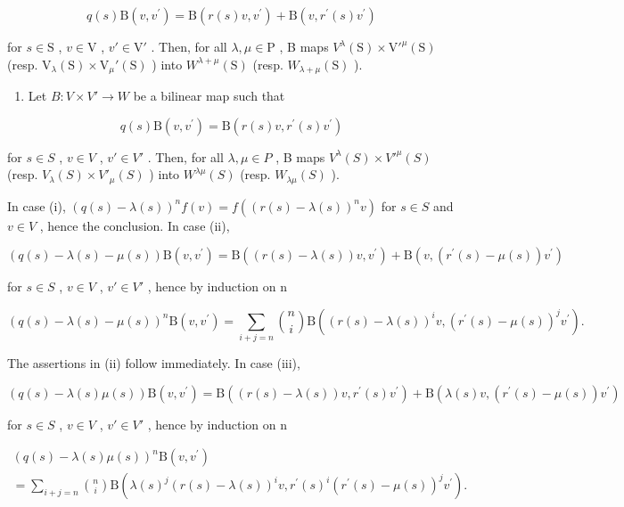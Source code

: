 \[
q (s) \mathrm{B} (v, v ^ {\prime}) = \mathrm{B} (r (s) v, v ^ {\prime}) + \mathrm{B} (v, r ^ {\prime} (s) v ^ {\prime})
\]

for \(s \in \mathrm{S}\) , \(v \in \mathrm{V}\) , \(v' \in \mathrm{V}'\) . Then, for all \(\lambda, \mu \in \mathrm{P}\) , B maps \(V^{\lambda}(\mathrm{S}) \times \mathrm{V}'^{\mu}(\mathrm{S})\) (resp. \(\mathrm{V}_{\lambda}(\mathrm{S}) \times \mathrm{V}_{\mu}'(\mathrm{S})\) ) into \(W^{\lambda + \mu}(\mathrm{S})\) (resp. \(W_{\lambda + \mu}(\mathrm{S})\) ).

\begin{enumerate}
\def\labelenumi{(\roman{enumi})}
\setcounter{enumi}{2}
\tightlist
\item
  Let \(B: V \times V' \to W\) be a bilinear map such that
\end{enumerate}

\[
q (s) \mathrm{B} (v, v ^ {\prime}) = \mathrm{B} (r (s) v, r ^ {\prime} (s) v ^ {\prime})
\]

for \(s \in S\) , \(v \in V\) , \(v' \in V'\) . Then, for all \(\lambda, \mu \in P\) , B maps \(V^{\lambda}(S) \times V'^{\mu}(S)\) (resp. \(V_{\lambda}(S) \times V'_{\mu}(S)\) ) into \(W^{\lambda\mu}(S)\) (resp. \(W_{\lambda\mu}(S)\) ).

In case (i), \((q(s) - \lambda(s))^n f(v) = f((r(s) - \lambda(s))^n v)\) for \(s \in S\) and \(v \in V\) , hence the conclusion. In case (ii),

\[
(q (s) - \lambda (s) - \mu (s)) \mathrm{B} (v, v ^ {\prime}) = \mathrm{B} ((r (s) - \lambda (s)) v, v ^ {\prime}) + \mathrm{B} (v, (r ^ {\prime} (s) - \mu (s)) v ^ {\prime})
\]

for \(s \in S\) , \(v \in V\) , \(v' \in V'\) , hence by induction on n

\[
(q (s) - \lambda (s) - \mu (s)) ^ {n} \mathrm{B} (v, v ^ {\prime}) = \sum_ {i + j = n} \binom {n} {i} \mathrm{B} ((r (s) - \lambda (s)) ^ {i} v, (r ^ {\prime} (s) - \mu (s)) ^ {j} v ^ {\prime}).
\]

The assertions in (ii) follow immediately. In case (iii),

\[
(q (s) - \lambda (s) \mu (s)) \mathrm{B} (v, v ^ {\prime}) = \mathrm{B} ((r (s) - \lambda (s)) v, r ^ {\prime} (s) v ^ {\prime}) + \mathrm{B} (\lambda (s) v, (r ^ {\prime} (s) - \mu (s)) v ^ {\prime})
\]

for \(s \in S\) , \(v \in V\) , \(v' \in V'\) , hence by induction on n

\[
\begin{array}{l} (q (s) - \lambda (s) \mu (s)) ^ {n} \mathrm{B} (v, v ^ {\prime}) \\ = \sum_ {i + j = n} \binom {n} {i} \mathrm{B} (\lambda (s) ^ {j} (r (s) - \lambda (s)) ^ {i} v, r ^ {\prime} (s) ^ {i} (r ^ {\prime} (s) - \mu (s)) ^ {j} v ^ {\prime}). \end{array}
\]

